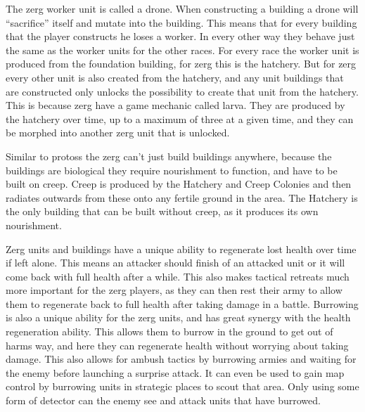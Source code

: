 The zerg worker unit is called a drone. When constructing a building a drone
will ``sacrifice'' itself and mutate into the building. This means that for
every building that the player constructs he loses a worker. In every other way
they behave just the same as the worker units for the other races. For every
race the worker unit is produced from the foundation building, for zerg this is
the hatchery. But for zerg every other unit is also created from the hatchery,
and any unit buildings that are constructed only unlocks the possibility to
create that unit from the hatchery. This is because zerg have a game mechanic
called larva. They are produced by the hatchery over time, up to a maximum of
three at a given time, and they can be morphed into another zerg unit that is
unlocked. 

Similar to protoss the zerg can't just build buildings anywhere, because the
buildings are biological they require nourishment to function, and have to be
built on creep. Creep is produced by the Hatchery and Creep Colonies and then
radiates outwards from these onto any fertile ground in the area. The Hatchery
is the only building that can be built without creep, as it produces its own
nourishment. 

Zerg units and buildings have a unique ability to regenerate lost health over
time if left alone. This means an attacker should finish of an attacked unit or
it will come back with full health after a while. This also makes tactical
retreats much more important for the zerg players, as they can then rest their
army to allow them to regenerate back to full health after taking damage in a
battle. Burrowing is also a unique ability for the zerg units, and has great
synergy with the health regeneration ability. This allows them to burrow in the
ground to get out of harms way, and here they can regenerate health without
worrying about taking damage. This also allows for ambush tactics by burrowing
armies and waiting for the enemy before launching a surprise attack. It can even
be used to gain map control by burrowing units in strategic places to scout that
area. Only using some form of detector can the enemy see and attack units that
have burrowed. 